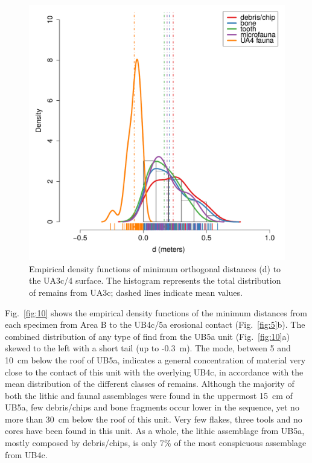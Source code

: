 \documentclass[preprint,authoryear,times]{elsarticle} %
\begin{document}
\begin{figure}[]
  \centering
  \includegraphics[width=1\textwidth]{../artwork/Fig9.pdf}
  \caption{Empirical density functions of minimum orthogonal distances (d) to the UA3c/4 surface. The histogram represents the total distribution of remains from UA3c; dashed lines indicate mean values.}
  \label{fig:9}
\end{figure}


Fig.~\ref{fig:10} shows the empirical density functions of the minimum distances from each specimen from Area B to the UB4c/5a erosional contact (Fig.~\ref{fig:5}b). The combined distribution of any type of find from the UB5a unit (Fig.~\ref{fig:10}a) skewed to the left with a short tail (up to -0.3~m). The mode, between 5 and 10~cm below the roof of UB5a, indicates a general concentration of material very close to the contact of this unit with the overlying UB4c, in accordance with the mean distribution of the different classes of remains. Although the majority of both the lithic and faunal assemblages were found in the uppermost 15~cm of UB5a, few debris/chips and bone fragments occur lower in the sequence, yet no more than 30~cm below the roof of this unit. Very few flakes, three tools and no cores have been found in this unit. As a whole, the lithic assemblage from UB5a, mostly composed by debris/chips, is only 7\% of the most conspicuous assemblage from UB4c.
\end{document}
